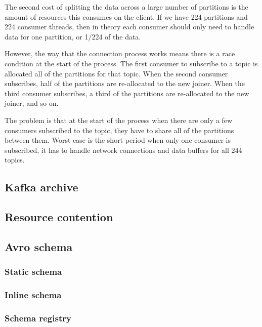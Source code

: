 \documentclass{article}
\begin{document}
The second cost of splitting the data across a large number of partitions is the amount of resources this consumes on the client.
If we have 224 partitions and 224 consumer threads, then in theory each consumer should only need to handle data for one partition, or 1/224 of the data.

However, the way that the connection process works means there is a race condition at the start of the process.
The first consumer to subscribe to a topic is allocated all of the partitions for that topic.
When the second consumer subscribes, half of the partitions are re-allocated to the new joiner.
When the third consumer subscribes, a third of the partitions are re-allocated to the new joiner, and so on.

The problem is that at the start of the process when there are only a few consumers subscribed to the topic,
they have to share all of the partitions between them. Worst case is the short period when only one
consumer is subscribed, it has to handle network connections and data buffers for all 244 topics.



\subsection{Kafka  archive}
\label{kafka-archive}

\subsection{Resource contention}
\label{kafka-contention}

\subsection{Avro schema}
\label{avro-schema}

\subsubsection{Static schema}
\label{avro-schema.static}

\subsubsection{Inline schema}
\label{avro-schema.inline}

\subsubsection{Schema registry}
\label{avro-schema.registry}
\end{document}
